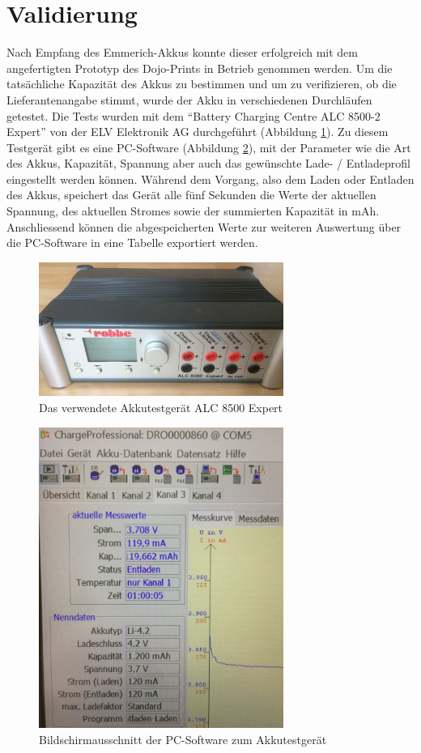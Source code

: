 \section{Validierung}

Nach Empfang des Emmerich-Akkus konnte dieser erfolgreich mit dem angefertigten Prototyp des Dojo-Prints in Betrieb genommen werden. Um die tatsächliche Kapazität des Akkus zu bestimmen und um zu verifizieren, ob die Lieferantenangabe stimmt, wurde der Akku in verschiedenen Durchläufen getestet. Die Tests wurden mit dem ``Battery Charging Centre ALC 8500-2 Expert'' von der ELV Elektronik AG durchgeführt (Abbildung \ref{fig:ALCExpert}). Zu diesem Testgerät gibt es eine PC-Software (Abbildung \ref{fig:ChargeProfessional}), mit der Parameter wie die Art des Akkus, Kapazität, Spannung aber auch das gewünschte Lade- / Entladeprofil eingestellt werden können. Während dem Vorgang, also dem Laden oder Entladen des Akkus, speichert das Gerät alle fünf Sekunden die Werte der aktuellen Spannung, des aktuellen Stromes sowie der summierten Kapazität in mAh. Anschliessend können die abgespeicherten Werte zur weiteren Auswertung über die PC-Software in eine Tabelle exportiert werden.\\

\begin{figure}[htp]
	\centering
	\includegraphics[width=8cm]{Bilder/ALC8500Expert.JPG}
	 \caption{Das verwendete Akkutestgerät ALC 8500 Expert}
	 \label{fig:ALCExpert}
\end{figure}

\begin{figure}[htp]
	\centering
	\includegraphics[width=8cm]{Bilder/ChargeProfessional.JPG}
	 \caption{Bildschirmausschnitt der PC-Software zum Akkutestgerät}
	 \label{fig:ChargeProfessional}
\end{figure}

